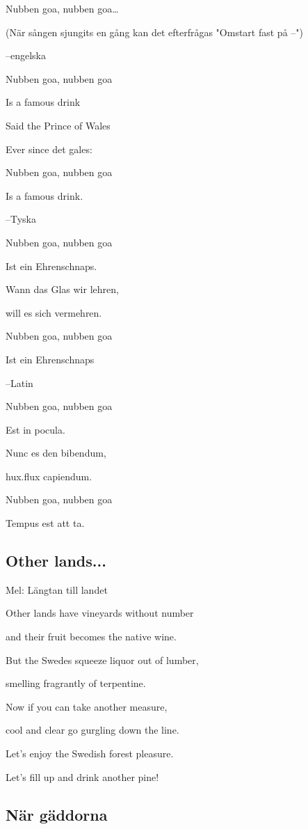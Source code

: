 Nubben goa, nubben goa…\bigskip

(När sången sjungits en gång kan det efterfrågas "Omstart fast på --")


--engelska

Nubben goa, nubben goa

Is a famous drink

Said the Prince of Wales

Ever since det gales:

Nubben goa, nubben goa

Is a famous drink.\bigskip


--Tyska

Nubben goa, nubben goa

Ist ein Ehrenschnaps.

Wann das Glas wir lehren,

will es sich vermehren.

Nubben goa, nubben goa

Ist ein Ehrenschnaps\bigskip

--Latin

Nubben goa, nubben goa

Est in pocula.

Nunc es den bibendum,

hux.flux capiendum.

Nubben goa, nubben goa

Tempus est att ta.\bigskip

\subsection{\textbf{Other lands...}}

Mel: Längtan till landet\bigskip

Other lands have vineyards without number

and their fruit becomes the native wine.

But the Swedes squeeze liquor out of lumber,

smelling fragrantly of terpentine.

Now if you can take another measure,

cool and clear go gurgling down the line.

Let's enjoy the Swedish forest pleasure.

Let's fill up and drink another pine!

\subsection{\textbf{När gäddorna}}

